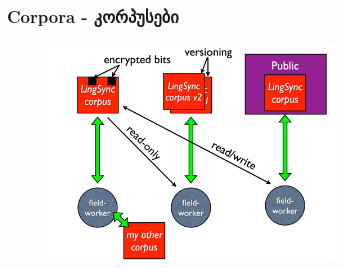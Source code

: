 \documentclass{beamer}
\begin{document}
%	  
%
%	  
%


\begin{frame}
\frametitle{Corpora - კორპუსები}

\begin{figure}
\begin{center}
\includegraphics[width=3in]{../figures/corpora}
\label{lingsync:corpora}
\end{center}
\end{figure}
\end{frame}



\end{document}
